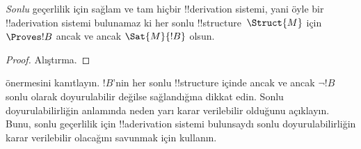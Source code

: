 \documentclass[../../../include/open-logic-section]{subfiles}
\begin{document}
\begin{cor}%
  \emph{Sonlu} geçerlilik için sağlam ve tam hiçbir !!{derivation} sistemi,
  yani öyle bir !!a{derivation} sistemi bulunamaz ki her sonlu
  !!{structure}~$\Struct{M}$ için $\Proves !B$ ancak ve ancak
  $\Sat{M}{!B}$ olsun.
\end{cor}

\begin{proof}
  Alıştırma.
\end{proof}

\begin{prob}
   önermesini kanıtlayın. $!B$'nin
  her sonlu !!{structure} içinde ancak ve ancak $\lnot !B$ sonlu olarak
  doyurulabilir değilse sağlandığına dikkat edin. Sonlu doyurulabilirliğin
   anlamında neden yarı karar verilebilir
  olduğunu açıklayın. Bunu, sonlu geçerlilik için !!a{derivation} sistemi
  bulunsaydı sonlu doyurulabilirliğin karar verilebilir olacağını savunmak
  için kullanın.
\end{prob}
\end{document}
